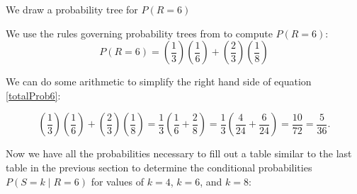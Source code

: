 \documentclass[a4paper,11pt]{article}
\begin{document}
We draw a probability tree for $P \left( R=6 \right)$

\begin{center}
\end{center}

We use the rules governing probability trees from \cite{reading3} to
compute $P \left( R=6 \right)$:
\begin{equation} \label{totalProb6}
  P \left( R=6 \right) = 
    \left( \frac{1}{3} \right) \left( \frac{1}{6} \right)
  + \left(  \frac{2}{3} \right) \left( \frac{1}{8} \right)
\end{equation}

We can do some arithmetic to simplify the right hand side of equation
\ref{totalProb6}:

\begin{equation} 
    \left( \frac{1}{3} \right) \left( \frac{1}{6} \right)
  + \left(  \frac{2}{3} \right) \left( \frac{1}{8} \right)
  = \frac{1}{3} \left( \frac{1}{6} + \frac{2}{8} \right)
  = \frac{1}{3} \left( \frac{4}{24} + \frac{6}{24} \right)
  = \frac{10}{72} = \frac{5}{36}.
\end{equation}

Now we have all the probabilities necessary to fill out a table similar
to the last table in the previous section to determine the conditional 
probabilities $P \left( S=k \mid R=6 \right)$ for values of $k=4$, 
$k=6$, and $k=8$:
\end{document}
